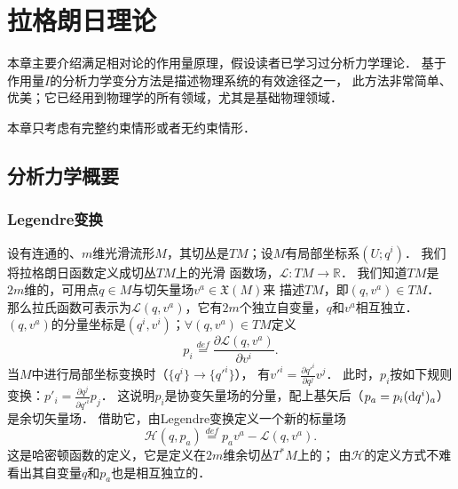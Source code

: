 
\chapter{拉格朗日理论}\label{chlh} %
本章主要介绍满足相对论的作用量原理，假设读者已学习过分析力学理论．
基于作用量$I$的分析力学变分方法是描述物理系统的有效途径之一，
此方法非常简单、优美；它已经用到物理学的所有领域，尤其是基础物理领域．

本章只考虑有完整约束情形或者无约束情形．



\section{分析力学概要}\label{chlh:sec_analysical-mechanics}
\subsection{Legendre变换}
设有连通的、$m$维光滑流形$M$，其切丛是$TM$；设$M$有局部坐标系$(U;q^i)$．
我们将{\heiti 拉格朗日函数}\cite[\S 19]{arnold-2006-mmcm}定义成切丛$TM$上的光滑
函数场，$\mathcal{L}:TM \to \mathbb{R}$．
我们知道$TM$是$2m$维的，可用点$q\in M$与切矢量场$v^a \in \mathfrak{X}(M)$来
描述$TM$，即$(q,v^a)\in TM$．
那么拉氏函数可表示为$\mathcal{L}(q,v^a)$，它有$2m$个独立自变量，$q$和$v^a$相互独立．
$(q,v^a)$的分量坐标是$(q^i,v^i)$；$\forall (q,v^a)\in TM$定义
\begin{equation}\label{chlh:eqn_momentum-particle}
    p_i \overset{def}{=} \frac{\partial \mathcal{L}(q,v^a)}{\partial v^i} .
\end{equation}
当$M$中进行局部坐标变换时（$\{q^i\}\to \{q'^i\}$），
有$v'^i = \frac{\partial q'^i}{\partial q^j} v^j$．
此时，$p_i$按如下规则变换：$p'_i = \frac{\partial q^j}{\partial q'^i} p_j$．
这说明$p_i$是协变矢量场的分量，配上基矢后（$p_a = p_i ({\rm d}q^i)_a$）是余切矢量场．
借助它，由Legendre变换定义一个新的标量场
\begin{equation}\label{chlh:eqn_Hamilton-particle}
    \mathcal{H}(q,p_a)\overset{def}{=} p_a v^a - \mathcal{L}(q,v^a) .
\end{equation}
这是{\heiti 哈密顿函数}的定义，它是定义在$2m$维余切丛$T^*M$上的；
由$\mathcal{H}$的定义方式不难看出其自变量$q$和$p_a$也是相互独立的．




